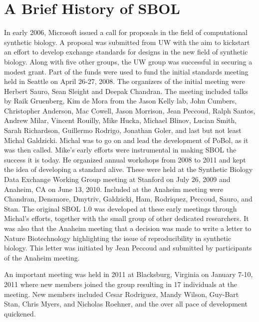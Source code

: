 \section{A Brief History of SBOL}


In early 2006, Microsoft issued a call for proposals in the field of computational synthetic biology. A proposal was submitted from UW with the aim to kickstart an effort to develop exchange standards for designs in the new field of synthetic biology. Along with five other groups, the UW group was successful in securing a modest grant. 
Part of the funds were used to fund the initial standards meeting held in Seattle on April 26-27, 2008. 
The organizers of the initial meeting were Herbert Sauro, Sean Sleight and Deepak Chandran. 
The meeting included talks by Raik Gruenberg,  Kim de Mora from the Jason Kelly lab, John Cumbers,  Christopher Anderson, Mac Cowell, Jason Morrison, Jean Peccoud, Ralph Santos, Andrew Milar, Vincent Rouilly, Mike Hucka, Michael Blinov, Lucian Smith, Sarah Richardson, Guillermo Rodrigo, Jonathan Goler, and last but not least Michal Galdzicki. 
Michal was to go on and lead the development of PoBol, as it was then called. Mike's early efforts were instrumental in making SBOL the success it is today. He organized annual workshops from 2008 to 2011 and kept the idea of developing a standard alive. 
These were held at the Synthetic Biology Data Exchange Working Group meeting at Stanford on July 26, 2009 and Anaheim, CA on June 13, 2010. 
Included at the Anaheim meeting were Chandran, Densmore, Dmytriv, Galdzicki, Ham, Rodriquez, Peccoud, Sauro, and Stan. 
The original SBOL 1.0 was developed at these early meetings through Michal's efforts, together with the small group of other dedicated researchers. 
It was also that the Anaheim meeting that a decision was made to write a letter to Nature Biotechnology highlighting the issue of reproducibility in synthetic biology. This letter was initiated by Jean Peccoud and submitted by participants of the Anaheim meeting. 

An important meeting was held in 2011 at Blacksburg, Virginia on January 7-10, 2011 where new members joined the group resulting in 17 individuals at the meeting. New members included Cesar Rodriguez, Mandy Wilson, Guy-Bart Stan, Chris Myers, and Nicholas Roehner, and the over all pace of development quickened. 

